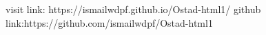 visit link: https://ismailwdpf.github.io/Ostad-html1/
github link:https://github.com/ismailwdpf/Ostad-html1